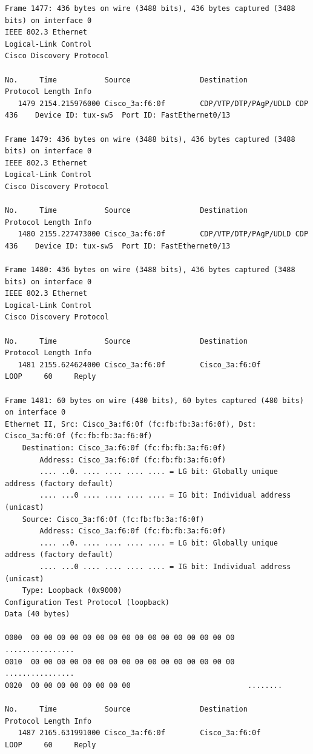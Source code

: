 \documentclass[a4paper,11pt]{article}
\begin{document}
\begin{lstlisting}
Frame 1477: 436 bytes on wire (3488 bits), 436 bytes captured (3488 bits) on interface 0
IEEE 802.3 Ethernet 
Logical-Link Control
Cisco Discovery Protocol

No.     Time           Source                Destination           Protocol Length Info
   1479 2154.215976000 Cisco_3a:f6:0f        CDP/VTP/DTP/PAgP/UDLD CDP      436    Device ID: tux-sw5  Port ID: FastEthernet0/13  

Frame 1479: 436 bytes on wire (3488 bits), 436 bytes captured (3488 bits) on interface 0
IEEE 802.3 Ethernet 
Logical-Link Control
Cisco Discovery Protocol

No.     Time           Source                Destination           Protocol Length Info
   1480 2155.227473000 Cisco_3a:f6:0f        CDP/VTP/DTP/PAgP/UDLD CDP      436    Device ID: tux-sw5  Port ID: FastEthernet0/13  

Frame 1480: 436 bytes on wire (3488 bits), 436 bytes captured (3488 bits) on interface 0
IEEE 802.3 Ethernet 
Logical-Link Control
Cisco Discovery Protocol

No.     Time           Source                Destination           Protocol Length Info
   1481 2155.624624000 Cisco_3a:f6:0f        Cisco_3a:f6:0f        LOOP     60     Reply

Frame 1481: 60 bytes on wire (480 bits), 60 bytes captured (480 bits) on interface 0
Ethernet II, Src: Cisco_3a:f6:0f (fc:fb:fb:3a:f6:0f), Dst: Cisco_3a:f6:0f (fc:fb:fb:3a:f6:0f)
    Destination: Cisco_3a:f6:0f (fc:fb:fb:3a:f6:0f)
        Address: Cisco_3a:f6:0f (fc:fb:fb:3a:f6:0f)
        .... ..0. .... .... .... .... = LG bit: Globally unique address (factory default)
        .... ...0 .... .... .... .... = IG bit: Individual address (unicast)
    Source: Cisco_3a:f6:0f (fc:fb:fb:3a:f6:0f)
        Address: Cisco_3a:f6:0f (fc:fb:fb:3a:f6:0f)
        .... ..0. .... .... .... .... = LG bit: Globally unique address (factory default)
        .... ...0 .... .... .... .... = IG bit: Individual address (unicast)
    Type: Loopback (0x9000)
Configuration Test Protocol (loopback)
Data (40 bytes)

0000  00 00 00 00 00 00 00 00 00 00 00 00 00 00 00 00   ................
0010  00 00 00 00 00 00 00 00 00 00 00 00 00 00 00 00   ................
0020  00 00 00 00 00 00 00 00                           ........

No.     Time           Source                Destination           Protocol Length Info
   1487 2165.631991000 Cisco_3a:f6:0f        Cisco_3a:f6:0f        LOOP     60     Reply


\end{lstlisting}
\end{document}
